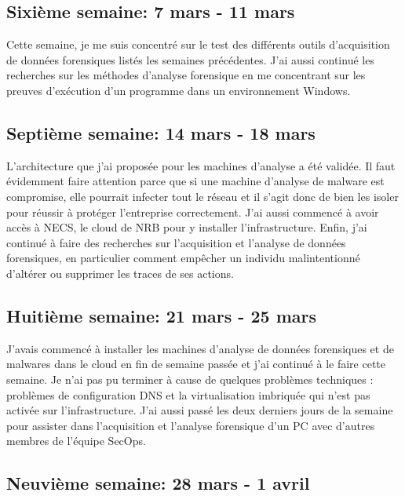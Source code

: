 \subsection{Sixième semaine: 7 mars - 11 mars}

Cette semaine, je me suis concentré sur le test des différents outils d'acquisition de données forensiques listés les semaines précédentes. J'ai aussi continué les recherches sur les méthodes d'analyse forensique en me concentrant sur les preuves d'exécution d'un programme dans un environnement Windows.



\subsection{Septième semaine: 14 mars - 18 mars}

L'architecture que j'ai proposée pour les machines d'analyse a été validée. Il faut évidemment faire attention parce que si une machine d'analyse de malware est compromise, elle pourrait infecter tout le réseau et il s'agit donc de bien les isoler pour réussir à protéger l'entreprise correctement. J'ai aussi commencé à avoir accès à NECS, le cloud de NRB pour y installer l'infrastructure. Enfin, j'ai continué à faire des recherches sur l'acquisition et l'analyse de données forensiques, en particulier comment empêcher un individu malintentionné d'altérer ou supprimer les traces de ses actions.



\subsection{Huitième semaine: 21 mars - 25 mars}

J'avais commencé à installer les machines d'analyse de données forensiques et de malwares dans le cloud en fin de semaine passée et j'ai continué à le faire cette semaine. Je n'ai pas pu terminer à cause de quelques problèmes techniques : problèmes de configuration DNS et la virtualisation imbriquée qui n'est pas activée sur l'infrastructure. J'ai aussi passé les deux derniers jours de la semaine pour assister dans l'acquisition et l'analyse forensique d'un PC avec d'autres membres de l'équipe SecOps.



\subsection{Neuvième semaine: 28 mars - 1 avril}

